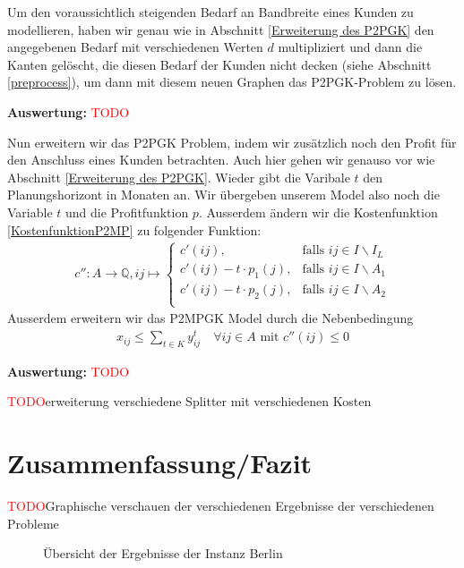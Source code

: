 \documentclass[11pt,a4paper]{article}
\newcommand{\Q}{\mathbb{Q}}
\newcommand{\TODO}{\textcolor{red}{TODO}}
\theoremstyle{my_th_style1}
\begin{document}
 Um den voraussichtlich steigenden Bedarf an Bandbreite eines Kunden zu modellieren, haben wir genau wie in Abschnitt \ref{Erweiterung des P2PGK} den angegebenen Bedarf mit verschiedenen Werten $d$ multipliziert und dann die Kanten gel\"oscht, die diesen Bedarf der Kunden nicht decken (siehe Abschnitt \ref{preprocess}), um dann mit diesem neuen Graphen das P2PGK-Problem zu l\"osen.
 
 \textbf{Auswertung:} \TODO
 
  
Nun erweitern wir das P2PGK Problem, indem wir zusätzlich noch den Profit für den Anschluss eines Kunden  betrachten.
 Auch hier gehen wir genauso vor wie Abschnitt \ref{Erweiterung des P2PGK}.  Wieder gibt die Varibale  $t$  den Planungshorizont in Monaten an. Wir \"ubergeben unserem Model also noch die Variable $t$ und die Profitfunktion $p$. Ausserdem \"andern wir die Kostenfunktion \eqref{KostenfunktionP2MP}  zu folgender Funktion:
 \begin{align*}
  c'': A  \rightarrow \Q,  ij  \mapsto \left\{\begin{array}{cl} 
 c'(ij), & \text{falls } ij \in I\backslash I_L \\ 
  c'(ij) -t  \cdot p_1(j), & \text{falls } ij \in I\backslash A_1 \\ 
    c'(ij) -t \cdot p_2(j), & \text{falls } ij \in I\backslash A_2 \\ 
\end{array}  \right.
 \end{align*}
 Ausserdem erweitern wir das P2MPGK Model durch die Nebenbedingung 
 \begin{align*}
 x_{ij} \leq \displaystyle\sum_{t \in K} y_{ij}^t \quad \forall ij \in A \text{ mit } c''(ij) \leq 0
 \end{align*}
 
 \textbf{Auswertung:} \TODO
 
 \TODO erweiterung verschiedene Splitter mit verschiedenen Kosten
 
 \section{Zusammenfassung/Fazit}
 \TODO Graphische verschauen der verschiedenen Ergebnisse der verschiedenen Probleme
 
 \begin{figure}[!htbp]
 	\caption{\"Ubersicht der Ergebnisse der Instanz Berlin}
 \end{figure}
 
\end{document}

